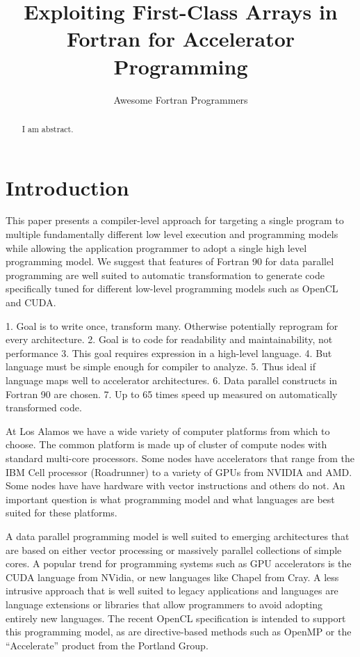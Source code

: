 \documentclass[10pt, conference, compsocconf]{IEEEtran}
\title{Exploiting First-Class Arrays in Fortran for Accelerator Programming}
\author{Awesome Fortran Programmers}
\begin{document}
\maketitle

\begin{abstract}
I am abstract.
\end{abstract}



\section{Introduction}

This paper presents a compiler-level approach for targeting a single
program to multiple fundamentally different low level execution and
programming models while allowing the application programmer to adopt
a single high level programming model.  We suggest that features of
Fortran 90 for data parallel programming are well suited to automatic
transformation to generate code specifically tuned for different
low-level programming models such as OpenCL and CUDA.

1. Goal is to write once, transform many. Otherwise potentially reprogram for every architecture.
2. Goal is to code for readability and maintainability, not performance
3. This goal requires expression in a high-level language.
4. But language must be simple enough for compiler to analyze.
5. Thus ideal if language maps well to accelerator architectures.
6. Data parallel constructs in Fortran 90 are chosen.
7. Up to 65 times speed up measured on automatically transformed code.

At Los Alamos we have a wide variety of computer platforms from which
to choose.  The common platform is made up of cluster of compute nodes
with standard multi-core processors.  Some nodes have accelerators
that range from the IBM Cell processor (Roadrunner) to a variety of
GPUs from NVIDIA and AMD.  Some nodes have have hardware with vector
instructions and others do not.  An important question is what programming
model and what languages are best suited for these platforms.

A data parallel programming model is well suited to emerging architectures
that are based on either vector processing or massively parallel collections
of simple cores.  A popular trend for programming systems such as GPU
accelerators is the CUDA language from NVidia, or new languages like Chapel
from Cray.  A less intrusive approach that is well suited to legacy 
applications and languages are language extensions or libraries that allow
programmers to avoid adopting entirely new languages.  The recent OpenCL
specification is intended to support this programming model, as are
directive-based methods such as OpenMP or the ``Accelerate'' product from
the Portland Group.
\end{document}
